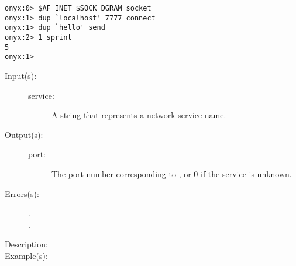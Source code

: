 \begin{description}
\begin{description}
\begin{verbatim}
onyx:0> $AF_INET $SOCK_DGRAM socket
onyx:1> dup `localhost' 7777 connect
onyx:1> dup `hello' send
onyx:2> 1 sprint
5
onyx:1>
		\end{verbatim}
	\end{description}
\label{systemdict:serviceport}
\item[{\onyxop{service}{serviceport}{port}}: ]
	\begin{description}\item[]
	\item[Input(s): ]
		\begin{description}\item[]
		\item[service: ]
			A string that represents a network service name.
		\end{description}
	\item[Output(s): ]
		\begin{description}\item[]
		\item[port: ]
			The port number corresponding to , or 0
			if the service is unknown.
		\end{description}
	\item[Errors(s): ]
		\begin{description}\item[]
		\item[.]
		\item[.]
		\end{description}
	\item[Description: ]
	\item[Example(s): ]\begin{verbatim}


\end{verbatim}
\end{description}
\end{description}
